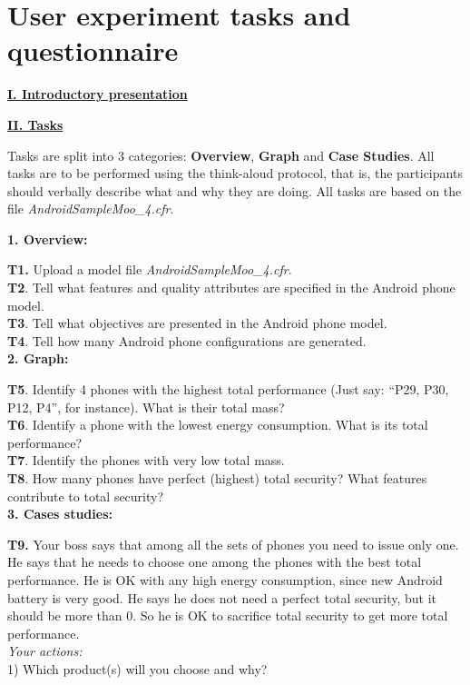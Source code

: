 \documentclass{acm_proc_article-sp}
\begin{document}
{}


\appendix
\section{User experiment tasks and questionnaire} \label{A}

\underline{ \textbf{I. Introductory presentation}}

\underline{ \textbf{II. Tasks}}

Tasks are split into 3 categories: \textbf{Overview}, \textbf{Graph} and \textbf{Case Studies}. All tasks are to be performed using the think-aloud protocol, that is, the participants should verbally describe what and why they are doing. All tasks are based on the file \textit{AndroidSampleMoo\_4.cfr}.

\textbf{1. Overview:}

\textbf{T1.} Upload a model file \textit{AndroidSampleMoo\_4.cfr}.\\
\textbf{T2}. Tell what features and quality attributes are specified in the Android phone model.\\
\textbf{T3}. Tell what objectives are presented in the Android phone model.\\
\textbf{T4}. Tell how many Android phone configurations are generated.\\

\textbf{2. Graph:}

\textbf{T5}. Identify 4 phones with the highest total performance (Just say: “P29, P30, P12, P4”, for instance). What is their total mass?\\
\textbf{T6}. Identify a phone with the lowest energy consumption. What is its total performance?\\
\textbf{T7}. Identify the phones with very low total mass.\\
\textbf{T8}. How many phones have perfect (highest) total security? What features contribute to total security?\\

\textbf{3. Cases studies:}

\textbf{T9.} Your boss says that among all the sets of phones you need to issue only one. He says that he needs to choose one among the phones with the best total performance. He is OK with any high energy consumption, since new Android battery is very good. He says he does not need a perfect total security, but it should be more than 0. So he is OK to sacrifice total security to get more total performance.\\
\textit{Your actions:}\\
1) Which product(s) will you choose and why?\\
\end{document}
